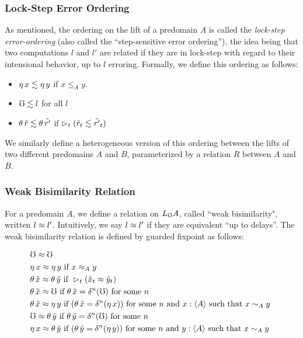 \subsubsection{Lock-Step Error Ordering}\label{sec:lock-step}

As mentioned, the ordering on the lift of a predomain $A$ is called the
\emph{lock-step error-ordering} (also called the ``step-sensitive error ordering''),
the idea being that two computations $l$ and $l'$ are related if they are in
lock-step with regard to their intensional behavior, up to $l$ erroring.
Formally, we define this ordering as follows:

\begin{itemize}
  \item 	$\eta\, x \lesssim \eta\, y$ if $x \le_A y$.
  \item 	$\mho \lesssim l$ for all $l$ 
  \item   $\theta\, \tilde{r} \lesssim \theta\, \tilde{r'}$ if
          $\vartriangleright_t (\tilde{r}_t \lesssim \tilde{r'}_t)$
\end{itemize}

We similarly define a heterogeneous version of this ordering between the lifts of two
different predomains $A$ and $B$, parameterized by a relation $R$ between $A$ and $B$.

\subsubsection{Weak Bisimilarity Relation}\label{sec:weak-bisimilarity}

For a predomain $A$, we define a relation on $L_\mho A$, called ``weak bisimilarity",
written $l \approx l'$. Intuitively, we say $l \approx l'$ if they are equivalent
``up to delays''.
%
The weak bisimilarity relation is defined by guarded fixpoint as follows:

\begin{align*}
  &\mho \bisim \mho \\
%
  &\eta\, x \bisim \eta\, y \text{ if } 
    x \bisim_A y \\
%		
  &\theta\, \tilde{x} \bisim \theta\, \tilde{y} \text{ if } 
    \later_t (\tilde{x}_t \bisim \tilde{y}_t) \\
%	
  &\theta\, \tilde{x} \bisim \mho \text{ if } 
    \theta\, \tilde{x} = \delta^n(\mho) \text { for some $n$ } \\
%	
  &\theta\, \tilde{x} \bisim \eta\, y \text{ if }
    (\theta\, \tilde{x} = \delta^n(\eta\, x))
  \text { for some $n$ and $x : \ty{A}$ such that $x \sim_A y$ } \\
%
  &\mho \bisim \theta\, \tilde{y} \text { if } 
    \theta\, \tilde{y} = \delta^n(\mho) \text { for some $n$ } \\
%	
  &\eta\, x \bisim \theta\, \tilde{y} \text { if }
    (\theta\, \tilde{y} = \delta^n (\eta\, y))
  \text { for some $n$ and $y : \ty{A}$ such that $x \sim_A y$ }
\end{align*}

